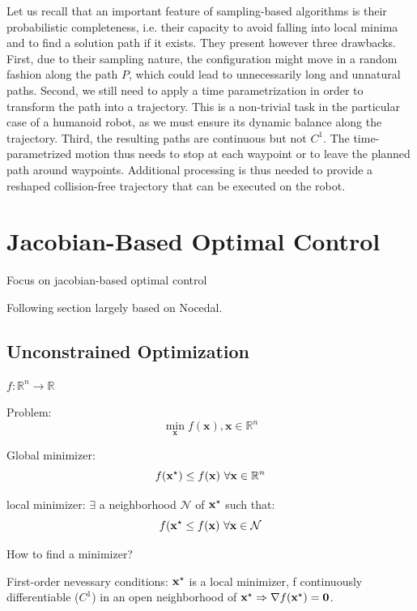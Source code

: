 Let us recall that an important feature of sampling-based algorithms
is their probabilistic completeness, i.e. their capacity to avoid
falling into local minima and to find a solution path if it
exists. They present however three drawbacks. First, due to their
sampling nature, the configuration \config{} might move in a random
fashion along the path $P$, which could lead to unnecessarily long and
unnatural paths. Second, we still need to apply a time parametrization
in order to transform the path into a trajectory. This is a
non-trivial task in the particular case of a humanoid robot, as we
must ensure its dynamic balance along the trajectory. Third, the
resulting paths are continuous but not $C^1$. The time-parametrized
motion thus needs to stop at each waypoint or to leave the planned
path around waypoints. Additional processing is thus needed to provide
a reshaped collision-free trajectory that can be executed on the
robot.

\section{Jacobian-Based Optimal Control}

Focus on jacobian-based optimal control

Following section largely based on Nocedal.

\subsection{Unconstrained Optimization}

$f:\mathbb R^n \rightarrow \mathbb R$

Problem:
\begin{equation}
\min_\mathbf{x}f(\mathbf{x}), \mathbf{x} \in \mathbb R^n
\end{equation}

Global minimizer:
\begin{equation}
f(\mathbf{x}^{\star}) \le f(\mathbf{x})~\forall \mathbf{x} \in \mathbb R^n
\end{equation}

local minimizer: $\exists$ a neighborhood $\mathcal{N}$ of
$\mathbf{x}^{\star}$ such that:
\begin{equation}
  f(\mathbf{x}^{\star} \le f(\mathbf{x})~\forall \mathbf{x} \in \mathcal{N}
\end{equation}

How to find a minimizer?

First-order nevessary conditions:
$\mathbf{x}^{\star}$ is a local minimizer, f continuously differentiable
($C^1$) in an open neighborhood of $\mathbf{x}^{\star} \Rightarrow
\nabla f(\mathbf{x}^{\star}) = \mathbf{0}$.

